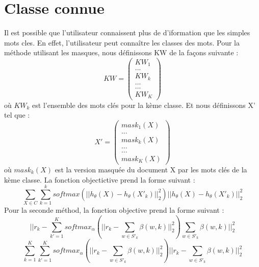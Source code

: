 \documentclass[a4paper]{article}
\begin{document}
\section{Classe connue}
Il est possible que l'utilisateur connaissent plus de d'iformation que les simples
mots cles. En effet, l'utilisateur peut connaître les classes des mots.
Pour la méthode utilisant les masques, nous définissons KW de la façons suivante :
\begin{equation*}
KW = \begin{pmatrix}KW_1  \\ ... \\ KW_k \\ ...\\ ... \\ KW_{K}\end{pmatrix}
\end{equation*}
où $KW_k$ est l'ensemble des mots clés pour la kème classe. Et nous définissons
X' tel que :
\begin{equation*}
X' = \begin{pmatrix}mask_1(X)  \\ ... \\ mask_k(X) \\ ...\\ ... \\ mask_K(X)\end{pmatrix}
\end{equation*}
où $mask_k(X)$ est la version masquée du document X  par les mots clés de la kème classe.
La fonction objectictive prend la forme suivant : 
$$
\sum_{X \in C} \sum_{k = 1}^k softmax(|| h_\theta(X) - h_\theta(X'_k)||_2^2)|| h_\theta(X) - h_\theta(X'_k)||_2^2
$$
Pour la seconde méthod, la fonction objective prend la forme suivant :
$$
|| r_k - \sum_{k'=1}^K softmax_\alpha(||r_k - \sum_{w \in S'_k} \beta(w, k)||_2^2) \sum_{w \in S'_k} \beta(w, k)||_2^2
$$
$$
\sum_{k=1}^K \sum_{k'=1}^K softmax_\alpha(||r_k - \sum_{w \in S'_k} \beta(w, k)||_2^2)||r_k - \sum_{w \in S'_k} \beta(w, k)||_2^2
$$
\end{document}
